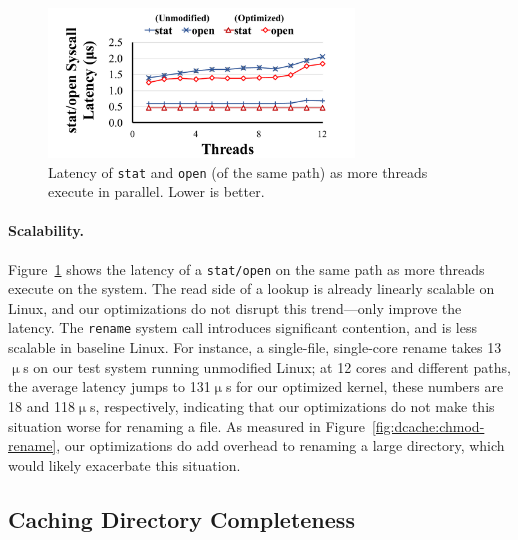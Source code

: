 \begin{figure}[t!]
\scriptsize
\centering
\includegraphics[width=3.2in]{dcache/plots/stat-open-scal.pdf}
\vspace{-5pt}
\caption[Directory cache optimization: {\tt stat} and {\tt open} latency in parallel.]
{Latency of {\tt stat} and {\tt open} (of the same path) as more threads execute in parallel.  Lower is better.}
\label{fig:dcache:scalability}
\end{figure}



\paragraph{Scalability.}
Figure~\ref{fig:dcache:scalability} shows the latency of a {\tt stat/open} on the same path as more threads execute on the system.  
The read side of a lookup is already linearly scalable on Linux, and our optimizations do not disrupt this trend---only improve the latency.
The {\tt rename} system call introduces significant contention, and is less scalable in baseline Linux.
For instance, a single-file, single-core rename takes 13$\upmu$s 
on our test system running unmodified Linux; 
at 12 cores and different paths, the average latency jumps to 131$\upmu$s
for our optimized kernel, these numbers are 18 and 118$\upmu$s, respectively, indicating that 
our optimizations do not make this situation worse for renaming a file.
As measured in Figure~\ref{fig:dcache:chmod-rename},
our optimizations do add overhead to renaming a large directory, which would likely exacerbate this situation.

\subsection{Caching Directory Completeness}

